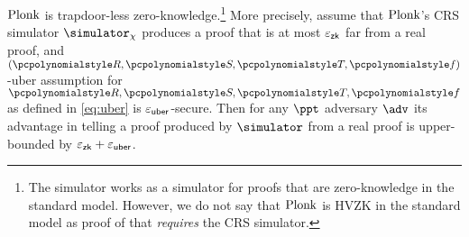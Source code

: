 \begin{lemma}\label{lem:plonk_tlzk}
	$\textnormal{{Plonk}}$ is trapdoor-less zero-knowledge.\footnote{The simulator works as a simulator for proofs that are zero-knowledge in the standard model. However, we do not say that $\textnormal{{Plonk}}$ is HVZK in the standard model as proof of that \emph{requires} the CRS simulator.} More precisely, assume that $\textnormal{{Plonk}}$'s CRS simulator $\simulator_\chi$ produces a proof that is at most $\varepsilon_{\mathsf{zk}}$ far from a real proof, and $(\pR, \pS, \pT, \pf)$-uber assumption for $\pR, \pS, \pT, \pf$ as defined in \cref{eq:uber} is $\varepsilon_{\mathsf{uber}}$-secure. Then for any $\ppt$ adversary $\adv$ its advantage in telling a proof produced by $\simulator$ from a real proof is upper-bounded by $\varepsilon_{\mathsf{zk}} + \varepsilon_{\mathsf{uber}}$.
	\end{lemma}
